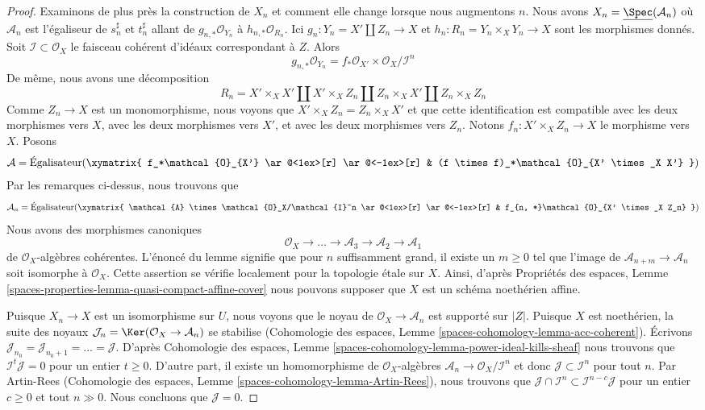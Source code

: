 \begin{proof}
Examinons de plus près la construction de $X_n$
et comment elle change lorsque nous augmentons $n$. Nous avons
$X_n = \underline{\Spec}(\mathcal{A}_n)$
où $\mathcal{A}_n$ est l'égaliseur de $s_n^\sharp$ et $t_n^\sharp$
allant de $g_{n, *}\mathcal{O}_{Y_n}$ à $h_{n, *}\mathcal{O}_{R_n}$.
Ici $g_n : Y_n = X' \amalg Z_n \to X$ et $h_n : R_n = Y_n \times_X Y_n \to X$
sont les morphismes donnés. Soit $\mathcal{I} \subset \mathcal{O}_X$ le
faisceau cohérent d'idéaux correspondant à $Z$. Alors
$$
g_{n, *}\mathcal{O}_{Y_n} =
f_*\mathcal{O}_{X'} \times \mathcal{O}_X/\mathcal{I}^n
$$
De même, nous avons une décomposition
$$
R_n = X' \times_X X' \amalg X' \times_X Z_n \amalg
Z_n \times_X X' \amalg Z_n \times_X Z_n
$$
Comme $Z_n \to X$ est un monomorphisme, nous voyons que
$X' \times_X Z_n = Z_n \times_X X'$ et que cette identification
est compatible avec les deux morphismes vers $X$, avec les deux morphismes vers
$X'$, et avec les deux morphismes vers $Z_n$.
Notons $f_n : X' \times_X Z_n \to X$ le morphisme vers $X$.
Posons
$$
\mathcal{A} = \text{Égalisateur}(
\xymatrix{
f_*\mathcal{O}_{X'} \ar@<1ex>[r] \ar@<-1ex>[r] &
(f \times f)_*\mathcal{O}_{X' \times_X X'}
}
)
$$
Par les remarques ci-dessus, nous trouvons que
$$
\mathcal{A}_n =
\text{Égalisateur}(
\xymatrix{
\mathcal{A} \times \mathcal{O}_X/\mathcal{I}^n \ar@<1ex>[r] \ar@<-1ex>[r] &
f_{n, *}\mathcal{O}_{X' \times_X Z_n}
}
)
$$
Nous avons des morphismes canoniques
$$
\mathcal{O}_X \to \ldots \to \mathcal{A}_3 \to \mathcal{A}_2 \to \mathcal{A}_1
$$
de $\mathcal{O}_X$-algèbres cohérentes. L'énoncé du lemme signifie que
pour $n$ suffisamment grand, il existe un $m \geq 0$ tel que l'image de
$\mathcal{A}_{n + m} \to \mathcal{A}_n$ soit isomorphe à $\mathcal{O}_X$.
Cette assertion se vérifie localement pour la topologie \'etale sur $X$. Ainsi, d'après Propriétés des espaces,
Lemme \ref{spaces-properties-lemma-quasi-compact-affine-cover}
nous pouvons supposer que $X$ est un schéma noethérien affine.

\medskip\noindent
Puisque $X_n \to X$ est un isomorphisme sur $U$, nous voyons que le noyau de $\mathcal{O}_X \to \mathcal{A}_n$ est supporté sur $|Z|$.
Puisque $X$ est noethérien, la suite des noyaux $\mathcal{J}_n = \Ker(\mathcal{O}_X \to \mathcal{A}_n)$ se stabilise (Cohomologie des espaces, Lemme \ref{spaces-cohomology-lemma-acc-coherent}).
Écrivons $\mathcal{J}_{n_0} = \mathcal{J}_{n_0 + 1} = \ldots = \mathcal{J}$.
D'après Cohomologie des espaces, Lemme \ref{spaces-cohomology-lemma-power-ideal-kills-sheaf} nous trouvons que $\mathcal{I}^t \mathcal{J} = 0$ pour un entier $t \geq 0$.
D'autre part, il existe un homomorphisme de $\mathcal{O}_X$-algèbres $\mathcal{A}_n \to \mathcal{O}_X/\mathcal{I}^n$ et donc $\mathcal{J} \subset \mathcal{I}^n$ pour tout $n$.
Par Artin-Rees (Cohomologie des espaces, Lemme \ref{spaces-cohomology-lemma-Artin-Rees}), nous trouvons que $\mathcal{J} \cap \mathcal{I}^n \subset \mathcal{I}^{n - c}\mathcal{J}$ pour un entier $c \geq 0$ et tout $n \gg 0$. Nous concluons que $\mathcal{J} = 0$.


\end{proof}
